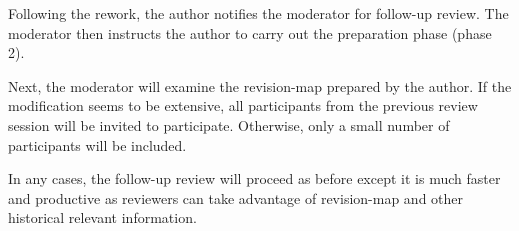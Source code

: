 
Following the rework, the author notifies the moderator for
follow-up review.  The moderator then instructs the author
to carry out the preparation phase (phase 2).

Next, the moderator will examine the revision-map prepared by
the author.  If the modification seems to be extensive, all
participants from the previous review session will be
invited to participate.  Otherwise, only a small number of
participants will be included.

In any cases, the follow-up review will proceed as before except
it is much faster and productive as reviewers can take advantage
of revision-map and other historical relevant information.



